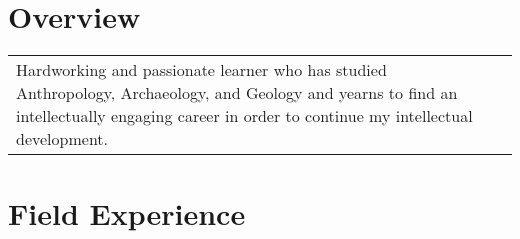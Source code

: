\documentclass[letterpaper]{resume}
\begin{document}
\author{Sarah F. Majors}
\maketitle

\section{Overview}
\goodbreak\vspace{\secskip}\par\noindent\begin{tabularx}{\linewidth}{Xr}  
   Hardworking and passionate learner who has studied Anthropology, Archaeology, and Geology and yearns to find an intellectually engaging career in order to continue my intellectual development.
\end{tabularx}

\section{Field Experience}
\end{document}
